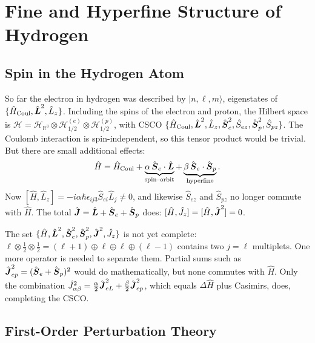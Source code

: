 \chapter{Fine and Hyperfine Structure of Hydrogen}
\label{ch:fine}

\section{Spin in the Hydrogen Atom}

So far the electron in hydrogen was described by $|n,\ell,m\rangle$, eigenstates of $\{\hat{H}_{\text{Coul}},\hat{\vect{L}}^2,\hat{L}_z\}$. Including the spins of the electron and proton, the Hilbert space is $\mathcal{H} = \mathcal{H}_{\mathbb{R}^3}\otimes\mathcal{H}^{(e)}_{1/2}\otimes\mathcal{H}^{(p)}_{1/2}$, with CSCO $\{\hat{H}_{\text{Coul}},\hat{\vect{L}}^2,\hat{L}_z,\hat{\vect{S}}_e^2,\hat{S}_{ez},\hat{\vect{S}}_p^2,\hat{S}_{pz}\}$. The Coulomb interaction is spin-independent, so this tensor product would be trivial. But there are small additional effects:
\[
    \hat{H} = \hat{H}_{\text{Coul}} + \underbrace{\alpha\,\hat{\vect{S}}_e\cdot\hat{\vect{L}}}_{\text{spin--orbit}} + \underbrace{\beta\,\hat{\vect{S}}_e\cdot\hat{\vect{S}}_p}_{\text{hyperfine}} .
\]
Now $[\hat{H},\hat{L}_z] = -i\alpha\hbar\epsilon_{ij3}\hat{S}_{ei}\hat{L}_j\neq0$, and likewise $\hat{S}_{ez}$ and $\hat{S}_{pz}$ no longer commute with $\hat{H}$. The total $\hat{\vect{J}} = \hat{\vect{L}} + \hat{\vect{S}}_e + \hat{\vect{S}}_p$ does: $[\hat{H},\hat{J}_z] = [\hat{H},\hat{\vect{J}}^2] = 0$.

The set $\{\hat{H},\hat{\vect{L}}^2,\hat{\vect{S}}_e^2,\hat{\vect{S}}_p^2,\hat{\vect{J}}^2,\hat{J}_z\}$ is not yet complete: $\ell\otimes\frac12\otimes\frac12 = (\ell+1)\oplus\ell\oplus\ell\oplus(\ell-1)$ contains two $j = \ell$ multiplets. One more operator is needed to separate them. Partial sums such as $\hat{\vect{J}}_{ep}^2 = (\hat{\vect{S}}_e+\hat{\vect{S}}_p)^2$ would do mathematically, but none commutes with $\hat{H}$. Only the combination $\hat{J}_{\alpha\beta}^2 = \frac\alpha2\hat{\vect{J}}_{eL}^2 + \frac\beta2\hat{\vect{J}}_{ep}^2$, which equals $\Delta\hat{H}$ plus Casimirs, does, completing the CSCO.

\section{First-Order Perturbation Theory}

